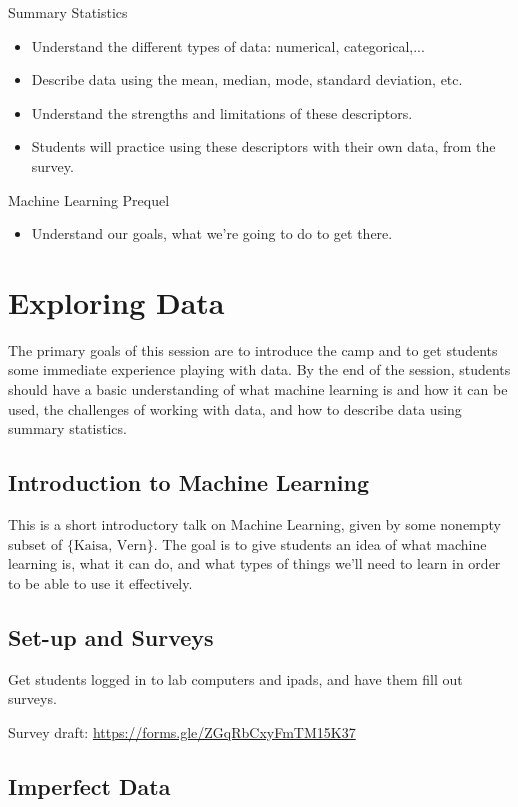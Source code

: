 \documentclass[11pt]{article}
\begin{document}
Summary Statistics
\begin{itemize}
\item Understand the different types of data: numerical, categorical,...
\item Describe data using the mean, median, mode, standard deviation, etc.
\item Understand the strengths and limitations of these descriptors.
\item Students will practice using these descriptors with their own data, from the survey.
\end{itemize}

Machine Learning Prequel
\begin{itemize}
\item Understand our goals, what we're going to do to get there.
\end{itemize}


\section*{Exploring Data}

The primary goals of this session are to introduce the camp and to get students some immediate experience playing with data. By the end of the session, students should have a basic understanding of what machine learning is and how it can be used, the challenges of working with data, and how to describe data using summary statistics.

\subsection*{Introduction to Machine Learning}

This is a short introductory talk on Machine Learning, given by some nonempty subset of $\{\text{Kaisa, Vern}\}$. The goal is to give students an idea of what machine learning is, what it can do, and what types of things we'll need to learn in order to be able to use it effectively.

\subsection*{Set-up and Surveys}

Get students logged in to lab computers and ipads, and have them fill out surveys.

Survey draft: \url{https://forms.gle/ZGqRbCxyFmTM15K37}

\subsection*{Imperfect Data}
\end{document}
